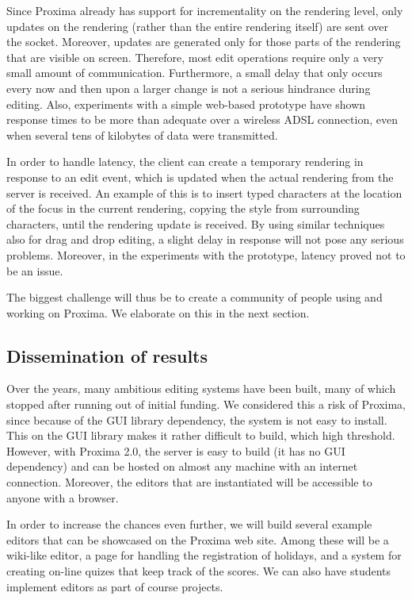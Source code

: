 \documentclass[10pt]{article}
\begin{document}
Since Proxima already has support for incrementality on the rendering level, only updates on the rendering (rather than the entire rendering itself) are sent over the socket. Moreover, updates are generated only for those parts of the rendering that are visible on screen. Therefore, most edit operations require only a very small amount of communication. Furthermore, a small delay that only occurs every now and then upon a larger change is not a serious hindrance during editing. Also, experiments with a simple web-based prototype have shown response times to be more than adequate over a wireless ADSL connection, even when several tens of kilobytes of data were transmitted. 

In order to handle latency, the client can create a temporary rendering in response to an edit event, which is updated when the actual rendering from the server is received. An example of this is to insert typed characters at the location of the focus in the current rendering, copying the style from surrounding characters, until the rendering update is received. By using similar techniques also for drag and drop editing, a slight delay in response will not pose any serious problems. Moreover, in the experiments with the prototype, latency proved not to be an issue.

The biggest challenge will thus be to create a community of people using and working on Proxima. We elaborate on this in the next section.

\subsection{Dissemination of results}

Over the years, many ambitious editing systems have been built, many of which stopped after running out of initial funding. We considered this a risk of Proxima, since because of the GUI library dependency, the system is not easy to install. This on the GUI library makes it rather difficult to build, which high threshold. However, with Proxima 2.0, the server is easy to build (it has no GUI dependency) and can be hosted on almost any machine with an internet connection. Moreover, the editors that are instantiated will be accessible to anyone with a browser.

In order to increase the chances even further, we will build several example editors that can be showcased on the Proxima web site. Among these will be a wiki-like editor, a page for handling the registration of holidays,  and a system for creating on-line quizes that keep track of the scores. We can also have students implement editors as part of course projects.
\end{document}
